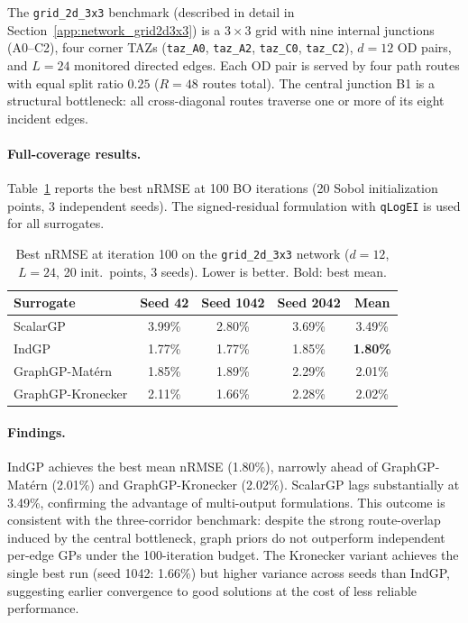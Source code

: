 \documentclass[11pt]{article}
\begin{document}
The \texttt{grid\_2d\_3x3} benchmark (described in detail in
Section~\ref{app:network_grid2d3x3}) is a $3 \times 3$ grid with nine
internal junctions (A0--C2), four corner TAZs
(\texttt{taz\_A0}, \texttt{taz\_A2}, \texttt{taz\_C0}, \texttt{taz\_C2}),
$d = 12$ OD pairs, and $L = 24$ monitored directed edges. Each OD pair is
served by four path routes with equal split ratio $0.25$ ($R = 48$
routes total). The central junction B1 is a structural bottleneck: all
cross-diagonal routes traverse one or more of its eight incident edges.

\paragraph{Full-coverage results.}
Table~\ref{tab:results-grid2d3x3} reports the best nRMSE at 100 BO iterations
(20 Sobol initialization points, 3 independent seeds). The signed-residual
formulation with \texttt{qLogEI} is used for all surrogates.

\begin{table}[h]
\centering
\caption{Best nRMSE at iteration 100 on the \texttt{grid\_2d\_3x3} network
($d=12$, $L=24$, 20 init.\ points, 3 seeds). Lower is better. Bold: best mean.}
\label{tab:results-grid2d3x3}
\begin{tabular}{lcccc}
\toprule
\textbf{Surrogate} & \textbf{Seed 42} & \textbf{Seed 1042} & \textbf{Seed 2042} & \textbf{Mean} \\
\midrule
ScalarGP             & 3.99\% & 2.80\% & 3.69\% & 3.49\% \\
IndGP                & 1.77\% & 1.77\% & 1.85\% & \textbf{1.80\%} \\
GraphGP-Mat\'ern     & 1.85\% & 1.89\% & 2.29\% & 2.01\% \\
GraphGP-Kronecker    & 2.11\% & 1.66\% & 2.28\% & 2.02\% \\
\bottomrule
\end{tabular}
\end{table}

\paragraph{Findings.}
IndGP achieves the best mean nRMSE (1.80\%), narrowly ahead of
GraphGP-Mat\'ern (2.01\%) and GraphGP-Kronecker (2.02\%). ScalarGP lags
substantially at 3.49\%, confirming the advantage of multi-output
formulations. This outcome is consistent with the three-corridor benchmark:
despite the strong route-overlap induced by the central bottleneck, graph
priors do not outperform independent per-edge GPs under the 100-iteration
budget. The Kronecker variant achieves the single best run (seed 1042:
1.66\%) but higher variance across seeds than IndGP, suggesting earlier
convergence to good solutions at the cost of less reliable performance.
\end{document}
